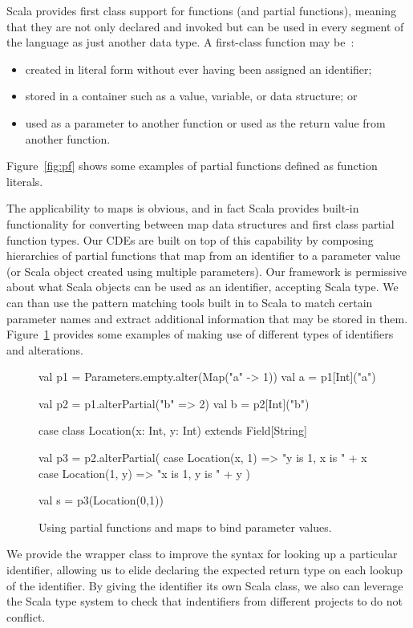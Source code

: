 Scala provides first class support for functions (and partial functions), meaning that they are not only declared and invoked 
but can be used in every segment of the language as just another data type. 
A first-class function may be~\cite{swartz2014learning}:
\begin{itemize}
\item created in literal form without ever having been assigned an identifier;
\item stored in a container such as a value, variable, or data structure; or
\item used as a parameter to another function or used as the return value from another function.
\end{itemize}
Figure~\ref{fig:pf} shows some examples of partial functions defined as function literals.

The applicability to maps is obvious, and in fact Scala provides built-in functionality for converting between map data structures and first class partial function types.
Our CDEs are built on top of this capability by composing hierarchies of partial functions that map from an identifier
to a parameter value (or Scala object created using multiple parameters).
Our framework is permissive about what Scala objects can be used as an identifier, accepting  Scala type.
We can than use the pattern matching tools built in to Scala to match certain parameter names and extract additional information that may be stored in them.
Figure~\ref{fig:paramspf} provides some examples of making use of different types of identifiers and alterations.

\begin{figure}
\centering
\begin{scala}
val p1 = Parameters.empty.alter(Map("a" -> 1))
val a = p1[Int]("a")

val p2 = p1.alterPartial({"b" => 2})
val b = p2[Int]("b")

case class Location(x: Int, y: Int) extends Field[String]

val p3 = p2.alterPartial({
  case Location(x, 1) => "y is 1, x is " + x
  case Location(1, y) => "x is 1, y is " + y
})

val s = p3(Location(0,1))
\end{scala} 
\caption{Using partial functions and maps to bind parameter values.}
\label{fig:paramspf}
\end{figure}

We provide the  wrapper class to improve the syntax for looking up a particular identifier, 
allowing us to elide declaring the expected return type on each lookup of the identifier.
By giving the identifier its own Scala class, we also can leverage the Scala type system to check that indentifiers from different projects to do not conflict.

